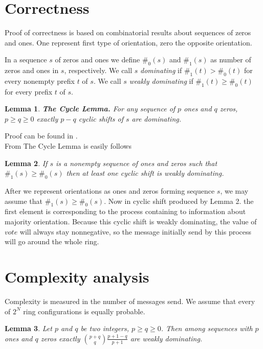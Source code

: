 \documentclass[a4paper,12pt]{article}
\newtheorem{lemma}{Lemma}
\begin{document}
\section{Correctness}
Proof of correctness is based on combinatorial results about sequences of zeros and ones. One represent first type of orientation, zero the opposite orientation.

In a sequence $s$ of zeros and ones we define $\#_0(s)$ and $\#_1(s)$ as number of zeros and ones in $s$, respectively. We call $s$ \textit{dominating} if $\#_1(t) > \#_0(t)$ for every nonempty prefix $t$ of $s$. We call $s$ \textit{weakly dominating} if $\#_1(t) \geq \#_0(t)$ for every prefix $t$ of $s$.

\begin{lemma}
\textbf{The Cycle Lemma.} For any sequence of $p$ ones and $q$ zeros, $p \geq q \geq 0$ exactly $p-q$ cyclic shifts of $s$ are dominating.
\end{lemma}

Proof can be found in \cite{DERSHOWITZ199035}.\\

From The Cycle Lemma is easily follows

\begin{lemma}
If $s$ is a nonempty sequence of ones and zeros such that $\#_1(s) \geq \#_0(s)$ then at least one cyclic shift is weakly dominating.
\end{lemma}

After we represent orientations as ones and zeros forming sequence $s$, we may assume that $\#_1(s) \geq \#_0(s)$. Now in cyclic shift produced by Lemma 2. the first element is corresponding to the process containing to information about majority orientation. Because this cyclic shift is weakly dominating, the value of $vote$ will always stay nonnegative, so the message initially send by this process will go around the whole ring.

\section{Complexity analysis}
Complexity is measured in the number of messages send. We assume that every of $2^N$ ring configurations is equally probable.

\begin{lemma}
Let $p$ and $q$ be two integers, $p \geq q \geq 0$. Then among sequences with $p$ ones and $q$ zeros exactly ${p+q \choose q} \frac{p+1-q}{p+1}$ are weakly dominating.
\end{lemma}
\end{document}
